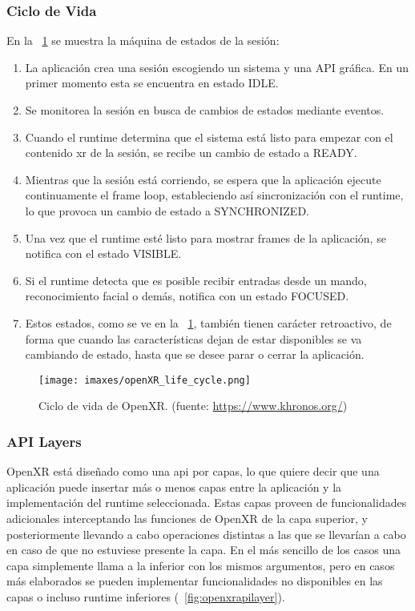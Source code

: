 \subsubsection{Ciclo de Vida}
En la \figurename~\ref{fig:openxrlifecycle} se muestra la máquina de estados de la sesión:
\begin{enumerate}
    \item La aplicación crea una sesión escogiendo un sistema y una API gráfica. En un primer momento esta se encuentra en estado IDLE.
    \item Se monitorea la sesión en busca de cambios de estados mediante eventos.
    \item Cuando el runtime determina que el sistema está listo para empezar con el contenido \acrshort{xr} de la sesión, se recibe un cambio de estado a READY.
    \item Mientras que la sesión está corriendo, se espera que la aplicación ejecute continuamente el frame loop, estableciendo así sincronización con el runtime, lo que provoca un cambio de estado a SYNCHRONIZED.
    \item Una vez que el runtime esté listo para mostrar frames de la aplicación, se notifica con el estado VISIBLE.
    \item Si el runtime detecta que es posible recibir entradas desde un mando, reconocimiento facial o demás, notifica con un estado FOCUSED.
    \item Estos estados, como se ve en la \figurename~\ref{fig:openxrlifecycle}, también tienen carácter retroactivo, de forma que cuando las características dejan de estar disponibles se va cambiando de estado, hasta que se desee parar o cerrar la aplicación.
    
\end{enumerate}

\begin{figure}
  \centering
  \texttt{[image: imaxes/openXR\_life\_cycle.png]}
  \caption{Ciclo de vida de OpenXR. (fuente: \href{https://www.khronos.org/}{https://www.khronos.org/})}
  \label{fig:openxrlifecycle}
\end{figure}

\subsubsection{API Layers}
OpenXR está diseñado como una \acrshort{api} por capas, lo que quiere decir que una aplicación puede insertar más o menos capas entre la aplicación y la implementación del runtime seleccionada. Estas capas proveen de funcionalidades adicionales interceptando las funciones de OpenXR de la capa superior, y posteriormente llevando a cabo operaciones distintas a las que se llevarían a cabo en caso de que no estuviese presente la capa. En el más sencillo de los casos una capa simplemente llama a la inferior con los mismos argumentos, pero en casos más elaborados se pueden implementar funcionalidades no disponibles en las capas o incluso runtime inferiores (\figurename~\ref{fig:openxrapilayer}).

